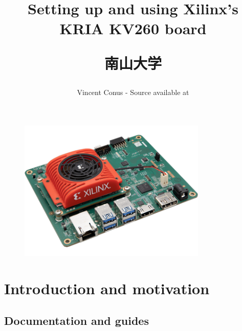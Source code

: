 \documentclass[10pt]{article}
\title{Setting up and using Xilinx's KRIA KV260 board \\
  [1ex] \large \begin{CJK}{UTF8}{min}南山大学\end{CJK}}
\date{}
\author{Vincent Conus  -  Source available at
  \gitlab{https://gitlab.com/sunoc/xilinx-kria-kv260-documentation}}
\begin{document}
\maketitle
\vspace{4cm}
\begin{figure}[H]
  \centering
  \includegraphics[width=0.8\textwidth]{./img/board}
\end{figure}

\pagebreak
\tableofcontents

\pagebreak
\section{Introduction and motivation}

\subsection{Documentation and guides}
\end{document}
